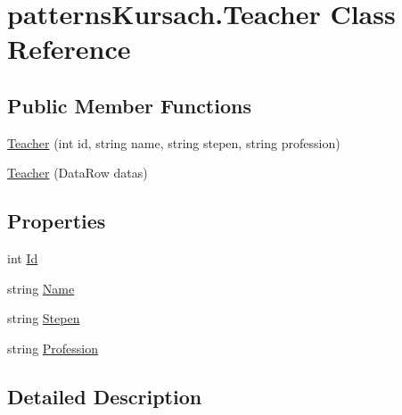 \hypertarget{classpatterns_kursach_1_1_teacher}{}\section{patterns\+Kursach.\+Teacher Class Reference}
\label{classpatterns_kursach_1_1_teacher}
\subsection*{Public Member Functions}
\begin{DoxyCompactItemize}
\item 
\mbox{\hyperlink{classpatterns_kursach_1_1_teacher_a46e92b2e9bbf73eca909a705124d38a6}{Teacher}} (int id, string name, string stepen, string profession)
\item 
\mbox{\hyperlink{classpatterns_kursach_1_1_teacher_a255a7c62cd79160a16dae729d19fdaf5}{Teacher}} (Data\+Row datas)
\end{DoxyCompactItemize}
\subsection*{Properties}
\begin{DoxyCompactItemize}
\item 
int \mbox{\hyperlink{classpatterns_kursach_1_1_teacher_ad7f356f4c06aaec13b8ee701201b5653}{Id}}
\item 
string \mbox{\hyperlink{classpatterns_kursach_1_1_teacher_a33a7069dea7f022fdc5690e3800abca3}{Name}}
\item 
string \mbox{\hyperlink{classpatterns_kursach_1_1_teacher_a561b33d8b07eb3bdfe7171d559252973}{Stepen}}
\item 
string \mbox{\hyperlink{classpatterns_kursach_1_1_teacher_a17ddb9dfa7008c885db763979ae47f7a}{Profession}}
\end{DoxyCompactItemize}


\subsection{Detailed Description}


